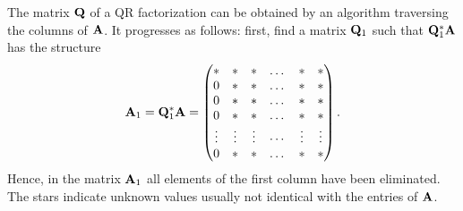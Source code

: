 \begin{intro}
  \label{intro:ortho:1}
  The matrix $\mathbf Q$ of a QR factorization can be obtained by an
  algorithm traversing the columns of $\mathbf A$. It progresses as
  follows: first, find a matrix $\mathbf Q_1$ such that $\mathbf Q_1^*\mathbf A$
  has the structure
  \begin{gather}
    \mathbf A_1 = \mathbf Q_1^* \mathbf A =
    \begin{pmatrix}
      * & * & * & \dots & * & * \\
      0 & * & * & \dots & * & * \\
      0 & * & * & \dots & * & * \\
      0 & * & * & \dots & * & * \\
      \vdots & \vdots & \vdots & \cdots & \vdots & \vdots \\
      0 & * & * & \dots & * & *
    \end{pmatrix}.
  \end{gather}
  Hence, in the matrix $\mathbf A_1$ all elements of the first column have
  been eliminated. The stars indicate unknown values usually not
  identical with the entries of $\mathbf A$.


\end{intro}
